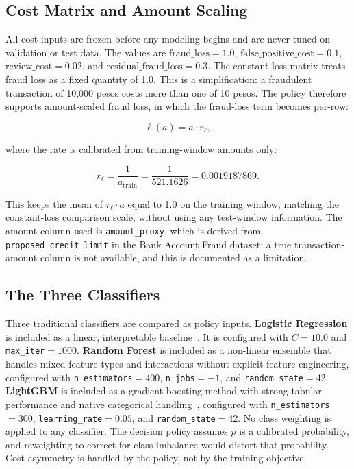 \documentclass[conference]{IEEEtran}
\begin{document}
\subsection{Cost Matrix and Amount Scaling}

All cost inputs are frozen before any modeling begins and are never tuned
on validation or test data. The values are $\text{fraud\_loss} = 1.0$,
$\text{false\_positive\_cost} = 0.1$, $\text{review\_cost} = 0.02$, and
$\text{residual\_fraud\_loss} = 0.3$. The constant-loss matrix treats fraud
loss as a fixed quantity of 1.0. This is a simplification: a fraudulent
transaction of 10,000 pesos costs more than one of 10 pesos. The policy
therefore supports amount-scaled fraud loss, in which the fraud-loss term
becomes per-row:

\begin{equation}
\ell(a) = a \cdot r_{\ell},
\end{equation}

where the rate is calibrated from training-window amounts only:

\begin{equation}
r_{\ell} = \frac{1}{\overline{a}_{\text{train}}}
         = \frac{1}{521.1626}
         = 0.0019187869.
\end{equation}

This keeps the mean of $r_{\ell} \cdot a$ equal to 1.0 on the training
window, matching the constant-loss comparison scale, without using any
test-window information. The amount column used is
\texttt{amount\_proxy}, which is derived from \texttt{proposed\_credit\_limit}
in the Bank Account Fraud dataset; a true transaction-amount column is not
available, and this is documented as a limitation.

\subsection{The Three Classifiers}

Three traditional classifiers are compared as policy inputs.
\textbf{Logistic Regression} is included as a linear, interpretable
baseline~\cite{pedregosa2011}. It is configured with $C = 10.0$ and
\texttt{max\_iter}$=1000$. \textbf{Random Forest} is included as a
non-linear ensemble that handles mixed feature types and interactions
without explicit feature engineering, configured with
\texttt{n\_estimators}$=400$, \texttt{n\_jobs}$=-1$, and
\texttt{random\_state}$=42$. \textbf{LightGBM} is included as a
gradient-boosting method with strong tabular performance and native
categorical handling~\cite{ke2017}, configured with
\texttt{n\_estimators}$=300$, \texttt{learning\_rate}$=0.05$, and
\texttt{random\_state}$=42$. No class weighting is applied to any
classifier. The decision policy assumes $p$ is a calibrated probability,
and reweighting to correct for class imbalance would distort that
probability. Cost asymmetry is handled by the policy, not by the training
objective.
\end{document}
